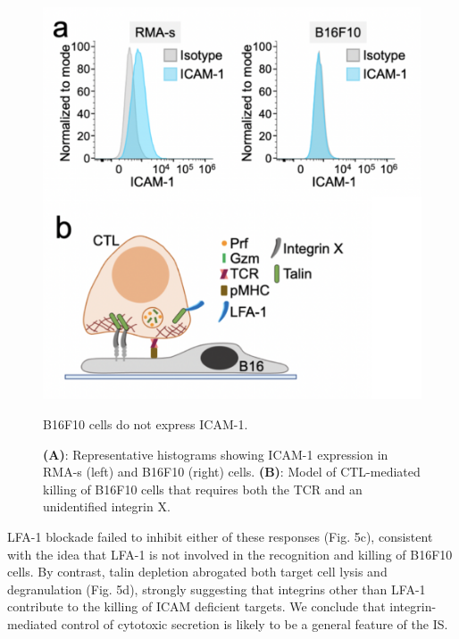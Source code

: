 \begin{figure}[htbp]
	\centering
	\includegraphics[width=1.0\columnwidth]{../figures/chapter3/fig5model.png}
	\caption{B16F10 cells do not express ICAM-1.}
	\caption*{\textbf{(A)}: Representative histograms showing ICAM-1 expression in RMA-s (left) and B16F10 (right) cells. \textbf{(B)}: Model of CTL-mediated killing of B16F10 cells that requires both the TCR and an unidentified integrin X.}
	\label{fig:fig5model}
\end{figure} 

LFA-1 blockade failed to inhibit either of these responses (Fig. 5c), consistent with the idea that LFA-1 is not involved in the recognition and killing of B16F10 cells. By contrast, talin depletion abrogated both target cell lysis and degranulation (Fig. 5d), strongly suggesting that integrins other than LFA-1 contribute to the killing of ICAM deficient targets. We conclude that integrin-mediated control of cytotoxic secretion is likely to be a general feature of the IS.

